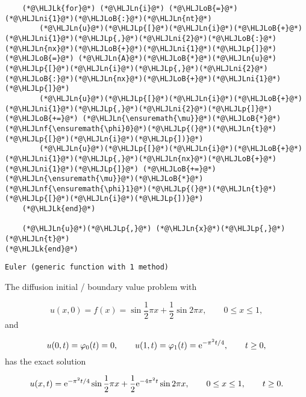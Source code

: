 \documentclass[12pt,landscape]{article}
\newcommand{\HLJLk}[1]{\textcolor[RGB]{148,91,176}{\textbf{#1}}}
\newcommand{\HLJLn}[1]{#1}
\newcommand{\HLJLnf}[1]{\textcolor[RGB]{66,102,213}{#1}}
\newcommand{\HLJLni}[1]{\textcolor[RGB]{59,151,46}{#1}}
\newcommand{\HLJLoB}[1]{\textcolor[RGB]{102,102,102}{\textbf{#1}}}
\newcommand{\HLJLp}[1]{#1}
\begin{document}
{\begin{lstlisting}
    (*@\HLJLk{for}@*) (*@\HLJLn{i}@*) (*@\HLJLoB{=}@*) (*@\HLJLni{1}@*)(*@\HLJLoB{:}@*)(*@\HLJLn{nt}@*)
        (*@\HLJLn{u}@*)(*@\HLJLp{[}@*)(*@\HLJLn{i}@*)(*@\HLJLoB{+}@*)(*@\HLJLni{1}@*)(*@\HLJLp{,}@*)(*@\HLJLni{2}@*)(*@\HLJLoB{:}@*)(*@\HLJLn{nx}@*)(*@\HLJLoB{+}@*)(*@\HLJLni{1}@*)(*@\HLJLp{]}@*) (*@\HLJLoB{=}@*) (*@\HLJLn{A}@*)(*@\HLJLoB{*}@*)(*@\HLJLn{u}@*)(*@\HLJLp{[}@*)(*@\HLJLn{i}@*)(*@\HLJLp{,}@*)(*@\HLJLni{2}@*)(*@\HLJLoB{:}@*)(*@\HLJLn{nx}@*)(*@\HLJLoB{+}@*)(*@\HLJLni{1}@*)(*@\HLJLp{]}@*) 
        (*@\HLJLn{u}@*)(*@\HLJLp{[}@*)(*@\HLJLn{i}@*)(*@\HLJLoB{+}@*)(*@\HLJLni{1}@*)(*@\HLJLp{,}@*)(*@\HLJLni{2}@*)(*@\HLJLp{]}@*) (*@\HLJLoB{+=}@*) (*@\HLJLn{\ensuremath{\mu}}@*)(*@\HLJLoB{*}@*)(*@\HLJLnf{\ensuremath{\phi}0}@*)(*@\HLJLp{(}@*)(*@\HLJLn{t}@*)(*@\HLJLp{[}@*)(*@\HLJLn{i}@*)(*@\HLJLp{])}@*)
        (*@\HLJLn{u}@*)(*@\HLJLp{[}@*)(*@\HLJLn{i}@*)(*@\HLJLoB{+}@*)(*@\HLJLni{1}@*)(*@\HLJLp{,}@*)(*@\HLJLn{nx}@*)(*@\HLJLoB{+}@*)(*@\HLJLni{1}@*)(*@\HLJLp{]}@*) (*@\HLJLoB{+=}@*) (*@\HLJLn{\ensuremath{\mu}}@*)(*@\HLJLoB{*}@*)(*@\HLJLnf{\ensuremath{\phi}1}@*)(*@\HLJLp{(}@*)(*@\HLJLn{t}@*)(*@\HLJLp{[}@*)(*@\HLJLn{i}@*)(*@\HLJLp{])}@*)
    (*@\HLJLk{end}@*)
    
    (*@\HLJLn{u}@*)(*@\HLJLp{,}@*) (*@\HLJLn{x}@*)(*@\HLJLp{,}@*) (*@\HLJLn{t}@*)
(*@\HLJLk{end}@*)
\end{lstlisting}

\begin{lstlisting}
Euler (generic function with 1 method)
\end{lstlisting}


The diffusion initial / boundary value problem with 

\[
u(x,0) = f(x) = \sin \frac{1}{2}\pi x + \frac{1}{2}\sin 2\pi x, \qquad 0 \leq x \leq 1, 
\]
and

\[
u(0,t) = \varphi_0(t) = 0, \qquad  u(1,t) = \varphi_1(t) = {\rm e}^{-\pi^2 t/4}, \qquad t \geq 0,
\]
has the exact solution

\[
u(x,t) = {\rm e}^{-\pi^2 t/4}\sin \frac{1}{2}\pi x + \frac{1}{2}{\rm e}^{-4\pi^2 t}\sin 2\pi x, \qquad 0 \leq x \leq 1, \qquad t \geq 0.
\]

}
\end{document}
